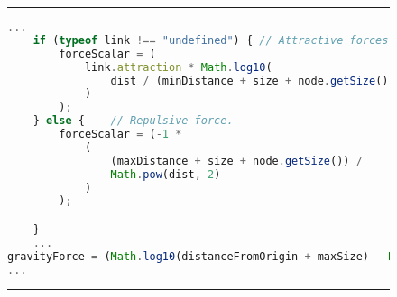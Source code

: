 \begin{figure}[H]
\noindent\rule{\textwidth}{1pt}
\begin{lstlisting}[language=JavaScript, caption={Force calculation FDG}, label={lst:getTotalForce}]
    ...
    if (typeof link !== "undefined") { // Attractive forces
        forceScalar = (
            link.attraction * Math.log10(
                dist / (minDistance + size + node.getSize())
            )
        );
    } else {    // Repulsive force.
        forceScalar = (-1 *
            (
                (maxDistance + size + node.getSize()) /
                Math.pow(dist, 2)
            )
        );

    }
    ...
gravityForce = (Math.log10(distanceFromOrigin + maxSize) - Math.log10(maxSize - distanceFromOrigin)) * gravityForce;
...
\end{lstlisting}
\noindent\rule{\textwidth}{1pt}
\end{figure}

